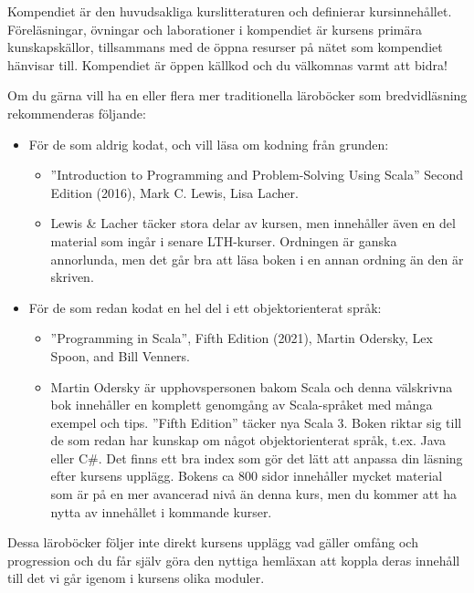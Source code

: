 \ifkompendium
\noindent Kompendiet är den huvudsakliga kurslitteraturen och definierar kursinnehållet. Föreläsningar, övningar och laborationer i kompendiet är kursens primära kunskapskällor, tillsammans med de öppna resurser på nätet som kompendiet hänvisar till. Kompendiet är öppen källkod och du välkomnas varmt att bidra!

Om du gärna vill ha en eller flera mer traditionella läroböcker som bredvidläsning rekommenderas följande:
\begin{itemize}[noitemsep, leftmargin=*]
\item För de som aldrig kodat, och vill läsa om kodning från grunden:
\begin{itemize}[nolistsep]
\item ''Introduction to Programming and Problem-Solving Using Scala'' Second Edition (2016), Mark C. Lewis, Lisa Lacher.  %

\item Lewis \& Lacher täcker stora delar av kursen, men innehåller även en del material som ingår i senare LTH-kurser. Ordningen är ganska annorlunda, men det går bra att läsa boken i en annan ordning än den är skriven.
\end{itemize}
\item För de som redan kodat en hel del i ett objektorienterat språk:
\begin{itemize}[nolistsep, noitemsep]
\item ''Programming in Scala'', Fifth Edition (2021), Martin Odersky, Lex Spoon, and Bill Venners.  
  \item Martin Odersky är upphovspersonen bakom Scala och denna välskrivna bok innehåller en komplett genomgång av Scala-språket med många exempel och tips. ''Fifth Edition'' täcker nya Scala 3. Boken riktar sig till de som redan har kunskap om något objektorienterat språk, t.ex. Java eller C\#. Det finns ett bra index som gör det lätt att anpassa din läsning efter kursens upplägg. Bokens ca 800 sidor innehåller mycket material som är på en mer avancerad nivå än denna kurs, men du kommer att ha nytta av innehållet i kommande kurser.
\end{itemize}
\end{itemize}
Dessa läroböcker följer inte direkt kursens upplägg vad gäller omfång och progression och du får själv göra den nyttiga hemläxan att koppla  deras innehåll till det vi går igenom i kursens olika moduler.

